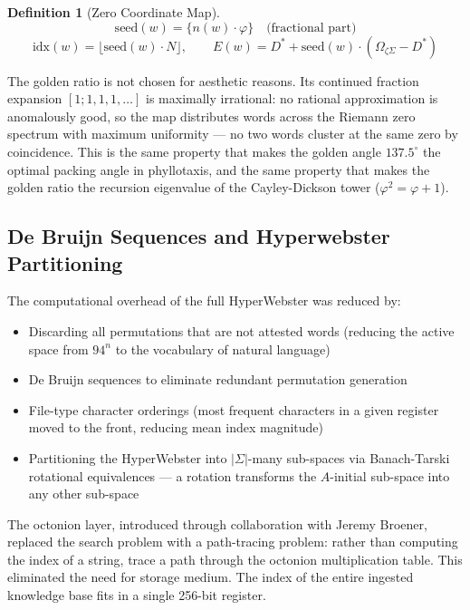 \documentclass[12pt,a4paper]{article}
\theoremstyle{definition}
\newtheorem{definition}[theorem]{Definition}
\theoremstyle{remark}
\newcommand{\OmZS}{\Omega_{\zeta\Sigma}}
\newcommand{\Dstar}{D^*}
\begin{document}
\begin{definition}[Zero Coordinate Map]
\[
\mathrm{seed}(w) = \{n(w)\cdot\varphi\} \quad \text{(fractional part)}
\]
\[
\mathrm{idx}(w) = \lfloor\mathrm{seed}(w)\cdot N\rfloor, \qquad
E(w) = \Dstar + \mathrm{seed}(w)\cdot(\OmZS - \Dstar)
\]
\end{definition}

The golden ratio is not chosen for aesthetic reasons.
Its continued fraction expansion $[1;1,1,1,\ldots]$ is maximally irrational:
no rational approximation is anomalously good, so the map distributes words
across the Riemann zero spectrum with maximum uniformity --- no two words cluster
at the same zero by coincidence.
This is the same property that makes the golden angle $137.5^\circ$ the optimal
packing angle in phyllotaxis, and the same property that makes the golden ratio
the recursion eigenvalue of the Cayley-Dickson tower ($\varphi^2 = \varphi + 1$).

\subsection{De Bruijn Sequences and Hyperwebster Partitioning}

The computational overhead of the full HyperWebster was reduced by:
\begin{itemize}
  \setlength\itemsep{2pt}
  \item Discarding all permutations that are not attested words (reducing the
        active space from $94^n$ to the vocabulary of natural language)
  \item De Bruijn sequences to eliminate redundant permutation generation
  \item File-type character orderings (most frequent characters in a given register
        moved to the front, reducing mean index magnitude)
  \item Partitioning the HyperWebster into $|\Sigma|$-many sub-spaces via Banach-Tarski
        rotational equivalences --- a rotation transforms the $A$-initial sub-space
        into any other sub-space
\end{itemize}

The octonion layer, introduced through collaboration with Jeremy Broener,
replaced the search problem with a path-tracing problem:
rather than computing the index of a string, trace a path through the
octonion multiplication table.
This eliminated the need for storage medium.
The index of the entire ingested knowledge base fits in a single 256-bit register.
\end{document}
